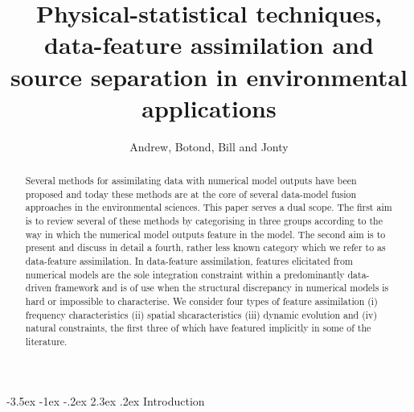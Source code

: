 \documentclass[10pt,a4paper]{article}
\title{Physical-statistical techniques, data-feature assimilation and source separation in environmental applications}
\author{Andrew, Botond, Bill and Jonty}
\makeatletter
\renewcommand\section{\@startsection{section}{1}{\z@}%
                                  {-3.5ex \@plus -1ex \@minus -.2ex}%
                                  {2.3ex \@plus.2ex}%
                                  {\normalfont\large\bfseries}}
\makeatother
\begin{document}
\maketitle

\begin{abstract}
Several methods for assimilating data with numerical model outputs have been proposed and today these methods are at the core of several data-model fusion approaches in the environmental sciences. This paper serves a dual scope. The first aim is to review several of these methods by categorising in three groups according to the way in which the numerical model outputs feature in the model. The second aim is to present and discuss in detail a fourth, rather less known category which we refer to as data-feature assimilation. In data-feature assimilation, features elicitated from numerical models are the sole integration constraint within a predominantly data-driven framework and is of use when the structural discrepancy in numerical models is hard or impossible to characterise. We consider four types of feature assimilation (i) frequency characteristics (ii) spatial shcaracteristics (iii) dynamic evolution and (iv) natural constraints, the first three of which have featured implicitly in some of the literature. %
\end{abstract}


\section{Introduction}
\end{document}
